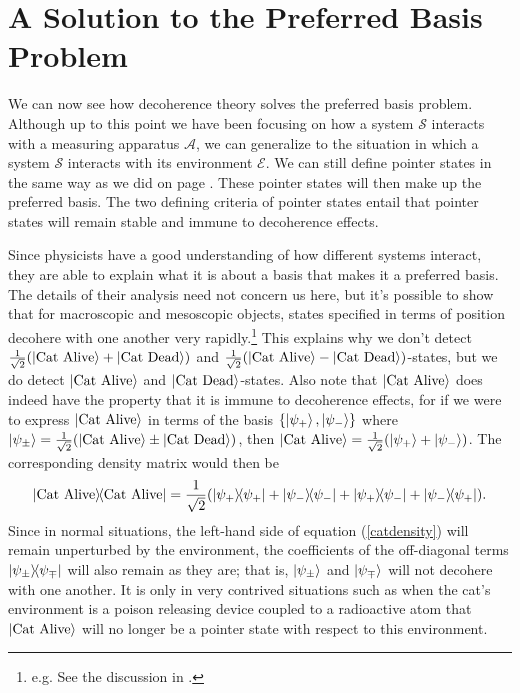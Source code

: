     \section{\label{sectionPreferredBasis}A Solution to the Preferred Basis Problem\protect\footnotemark}
    We can now see how decoherence theory solves the preferred basis problem. Although up to this point we have been focusing on how a system $\mathcal{S}$ interacts with a measuring apparatus $\mathcal{A}$, we can generalize to the situation in which a system $\mathcal{S}$ interacts with its environment $\mathcal{E}$. We can still define pointer states in the same way as we did on page \pageref{pointer}. These pointer states will then make up the preferred basis. The two defining criteria of pointer states entail that pointer states will remain stable and immune to decoherence effects. 
    
    Since physicists have a good understanding of how different systems interact, they are able to explain what it is about a basis that makes it a preferred basis.  The details of their analysis need not concern us here, but it's possible to show that for macroscopic and mesoscopic objects, states specified in terms of position decohere with one another very rapidly.\footnote{e.g. See the discussion in \cite[94]{Schlosshauer}.} This explains why we don't detect $\frac{1}{\sqrt{2}}(\ket{\text{Cat Alive}}+\ket{\text{Cat Dead}})$ and $\frac{1}{\sqrt{2}}(\ket{\text{Cat Alive}}-\ket{\text{Cat Dead}})$-states, but we do detect $\ket{\text{Cat Alive}}$ and $\ket{\text{Cat Dead}}$-states. Also note that $\ket{\text{Cat Alive}}$  does indeed have the property that it is immune to decoherence effects, for if we were to express $\ket{\text{Cat Alive}}$ in terms of the basis $\{\ket{\psi_+},\ket{\psi_-} \}$ where $\ket{\psi_\pm}=\frac{1}{\sqrt{2}}(\ket{\text{Cat Alive}}\pm\ket{\text{Cat Dead}})$, then $\ket{\text{Cat Alive}}=\frac{1}{\sqrt{2}}(\ket{\psi_+}+\ket{\psi_-})$. The corresponding density matrix would then be 
    \begin{equation}\label{catdensity}\dyad{\text{Cat Alive}}=\frac{1}{\sqrt{2}}(\dyad{\psi_+}+\dyad{\psi_-}+\dyad{\psi_+}{\psi_-}+\dyad{\psi_-}{\psi_+}).
    \end{equation} Since in normal situations, the left-hand side of equation (\ref{catdensity}) will remain unperturbed by the environment, the coefficients of the off-diagonal terms $\dyad{\psi_\pm}{\psi_\mp}$ will also remain as they are; that is, $\ket{\psi_\pm}$ and $\ket{\psi_\mp}$ will not decohere with one another. It is only in very contrived situations such as when the cat's environment is a poison releasing device coupled to a radioactive atom that $\ket{\text{Cat Alive}}$ will no longer be a pointer state with respect to this environment.
   